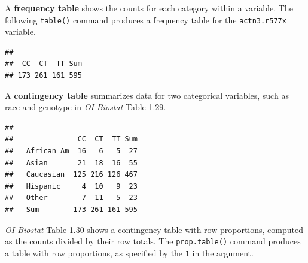 A \textbf{frequency table} shows the counts for each category within a variable. The following \texttt{table()} command produces a frequency table for the \texttt{actn3.r577x} variable.

\begin{knitrout}
\color{fgcolor}\begin{kframe}
\begin{alltt}
\hlstd{(}\hlopt{$}
\end{alltt}
\begin{verbatim}
## 
##  CC  CT  TT Sum 
## 173 261 161 595
\end{verbatim}
\end{kframe}
\end{knitrout}

A \textbf{contingency table} summarizes data for two categorical variables, such as race and genotype in \textit{OI Biostat} Table 1.29. 

\begin{knitrout}
\color{fgcolor}\begin{kframe}
\begin{alltt}
\hlstd{(}\hlopt{$}\hlopt{$}
\end{alltt}
\begin{verbatim}
##             
##               CC  CT  TT Sum
##   African Am  16   6   5  27
##   Asian       21  18  16  55
##   Caucasian  125 216 126 467
##   Hispanic     4  10   9  23
##   Other        7  11   5  23
##   Sum        173 261 161 595
\end{verbatim}
\end{kframe}
\end{knitrout}

\textit{OI Biostat} Table 1.30 shows a contingency table with row proportions, computed as the counts divided by their row totals. The \texttt{prop.table()} command produces a table with row proportions, as specified by the \texttt{1} in the argument.

